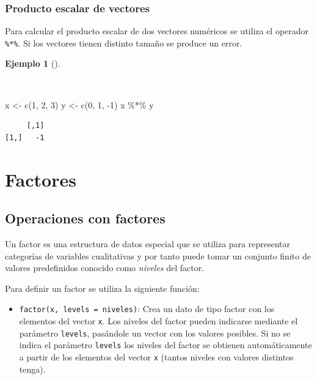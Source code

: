 \documentclass[
  spanish,
  a4paper,
]{scrreport}
\newenvironment{Shaded}{\begin{snugshade}}{\end{snugshade}}
\newcommand{\DecValTok}[1]{\textcolor[rgb]{0.68,0.00,0.00}{#1}}
\newcommand{\FunctionTok}[1]{\textcolor[rgb]{0.28,0.35,0.67}{#1}}
\newcommand{\NormalTok}[1]{\textcolor[rgb]{0.00,0.23,0.31}{#1}}
\newcommand{\OtherTok}[1]{\textcolor[rgb]{0.00,0.23,0.31}{#1}}
\newcommand{\SpecialCharTok}[1]{\textcolor[rgb]{0.37,0.37,0.37}{#1}}
\providecommand{\tightlist}{%
  \setlength{\itemsep}{0pt}\setlength{\parskip}{0pt}}
\theoremstyle{definition}
\theoremstyle{definition}
\newtheorem{example}{Ejemplo}[chapter]
\theoremstyle{remark}
\begin{document}
\subsubsection{Producto escalar de
vectores}\label{producto-escalar-de-vectores}

Para calcular el producto escalar de dos vectores numéricos se utiliza
el operador \texttt{\%*\%}. Si los vectores tienen distinto tamaño se
produce un error.

\begin{example}[]\protect\hypertarget{exm-producto-escalar}{}\label{exm-producto-escalar}

~

\begin{Shaded}
\begin{Highlighting}[]
\NormalTok{x }\OtherTok{\textless{}{-}} \FunctionTok{c}\NormalTok{(}\DecValTok{1}\NormalTok{, }\DecValTok{2}\NormalTok{, }\DecValTok{3}\NormalTok{)}
\NormalTok{y }\OtherTok{\textless{}{-}} \FunctionTok{c}\NormalTok{(}\DecValTok{0}\NormalTok{, }\DecValTok{1}\NormalTok{, }\SpecialCharTok{{-}}\DecValTok{1}\NormalTok{)}
\NormalTok{x }\SpecialCharTok{\%*\%}\NormalTok{ y}
\end{Highlighting}
\end{Shaded}

\begin{verbatim}
     [,1]
[1,]   -1
\end{verbatim}

\end{example}

\section{Factores}\label{factores}

\subsection{Operaciones con factores}\label{operaciones-con-factores}

Un factor es una estructura de datos especial que se utiliza para
representar categorías de variables cualitativas y por tanto puede tomar
un conjunto finito de valores predefinidos conocido como \emph{niveles}
del factor.

Para definir un factor se utiliza la siguiente función:

\begin{itemize}
\tightlist
\item
  \texttt{factor(x,\ levels\ =\ niveles)}: Crea un dato de tipo factor
  con los elementos del vector \texttt{x}. Los niveles del factor pueden
  indicarse mediante el parámetro \texttt{levels}, pasándole un vector
  con los valores posibles. Si no se indica el parámetro \texttt{levels}
  los niveles del factor se obtienen automáticamente a partir de los
  elementos del vector \texttt{x} (tantos niveles con valores distintos
  tenga).
\end{itemize}
\end{document}
